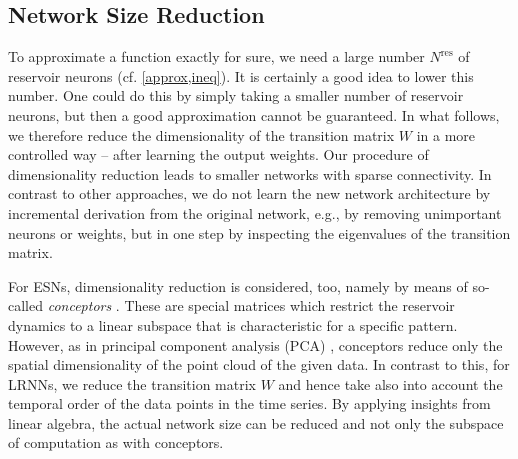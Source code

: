 \documentclass{sn-jnl}
\theoremstyle{definition}
\newtheorem{remk}{Remark}
\begin{document}

\subsection{Network Size Reduction}\label{reduce}

To approximate a function exactly for sure, we need a large number
$N^\mathrm{res}$ of reservoir neurons (cf. \cref{approx,ineq}). It is certainly a
good idea to lower this number. One could do this by simply taking a smaller
number of reservoir neurons, but then a good approximation cannot be guaranteed.
In what follows, we therefore reduce the dimensionality of the transition matrix $W$ in a
more controlled way -- after learning the output weights. Our procedure of
dimensionality reduction leads to smaller networks with sparse connectivity. In
contrast to other approaches, we do not learn the new network architecture by
incremental derivation from the original network, e.g., by removing unimportant
neurons or weights, but in one step by inspecting the eigenvalues of the
transition matrix.

For ESNs, dimensionality reduction is considered, too, namely by means of
so-called \emph{conceptors} \citep{Jae14,Jae17,KOS21b}. These are special matrices which
restrict the reservoir dynamics to a linear subspace that is characteristic for
a specific pattern. However, as in principal component analysis (PCA) \citep{Jol11}, conceptors
reduce only the spatial dimensionality of the point cloud of the given data. In
contrast to this, for LRNNs, we reduce the transition matrix $W$ and hence take
also into account the temporal order of the data points in the time series. By
applying insights from linear algebra, the actual network size can be reduced
and not only the subspace of computation as with conceptors.
\end{document}
